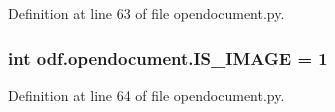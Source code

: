Definition at line 63 of file opendocument.\+py.

\hypertarget{namespaceodf_1_1opendocument_abdff0b1ae362b65dc635c8e3e74e36cf}{
\subsubsection[{I\+S\+\_\+\+I\+M\+A\+G\+E}]{\setlength{\rightskip}{0pt plus 5cm}int odf.\+opendocument.\+I\+S\+\_\+\+I\+M\+A\+G\+E = 1}}\label{namespaceodf_1_1opendocument_abdff0b1ae362b65dc635c8e3e74e36cf}


Definition at line 64 of file opendocument.\+py.

